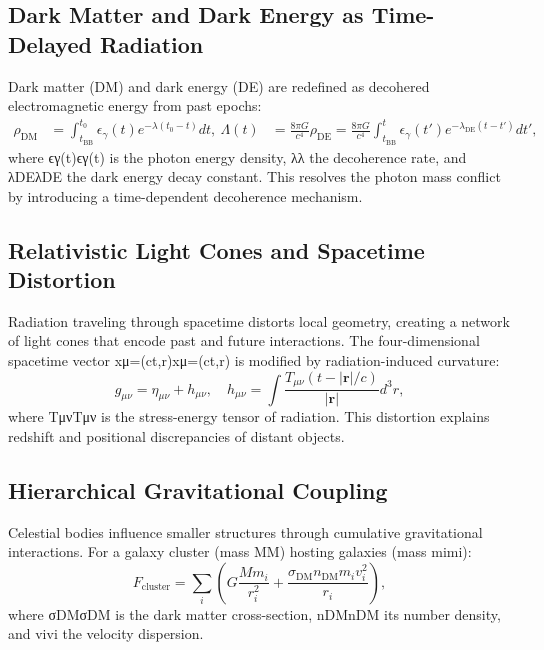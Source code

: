 \documentclass{article}
\begin{document}
\subsection{Dark Matter and Dark Energy as Time-Delayed Radiation}
Dark matter (DM) and dark energy (DE) are redefined as decohered electromagnetic energy from past epochs:
\begin{align}
\rho_{\text{DM}} &= \int_{t_{\text{BB}}}^{t_0} \epsilon_{\gamma}(t) e^{-\lambda (t_0 - t)} dt, \label{eq:dm } \
\Lambda(t) &= \frac{8\pi G}{c^4} \rho_{\text{DE}} = \frac{8\pi G}{c^4} \int_{t_{\text{BB}}}^{t} \epsilon_{\gamma}(t') e^{-\lambda_{\text{DE}} (t - t')} dt', \label{eq:de }
\end{align}
where ϵγ(t)ϵγ​(t) is the photon energy density, λλ the decoherence rate, and λDEλDE​ the dark energy decay constant. This resolves the photon mass conflict by introducing a time-dependent decoherence mechanism.

\subsection{Relativistic Light Cones and Spacetime Distortion}
Radiation traveling through spacetime distorts local geometry, creating a network of light cones that encode past and future interactions. The four-dimensional spacetime vector xμ=(ct,r)xμ=(ct,r) is modified by radiation-induced curvature:
\begin{equation}
g_{\mu\nu} = \eta_{\mu\nu} + h_{\mu\nu}, \quad h_{\mu\nu} = \int \frac{T_{\mu\nu}(t - |\bm{r}|/c)}{|\bm{r}|} d^3r, \label{eq:metric_pert }
\end{equation}
where TμνTμν​ is the stress-energy tensor of radiation. This distortion explains redshift and positional discrepancies of distant objects.

\subsection{Hierarchical Gravitational Coupling}
Celestial bodies influence smaller structures through cumulative gravitational interactions. For a galaxy cluster (mass MM) hosting galaxies (mass mimi​):
\begin{equation}
F_{\text{cluster}} = \sum_i \left( G \frac{M m_i}{r_i^2} + \frac{\sigma_{\text{DM}} n_{\text{DM}} m_i v_i^2}{r_i} \right), \label{eq:hierarchy }
\end{equation}
where σDMσDM​ is the dark matter cross-section, nDMnDM​ its number density, and vivi​ the velocity dispersion.
\end{document}
